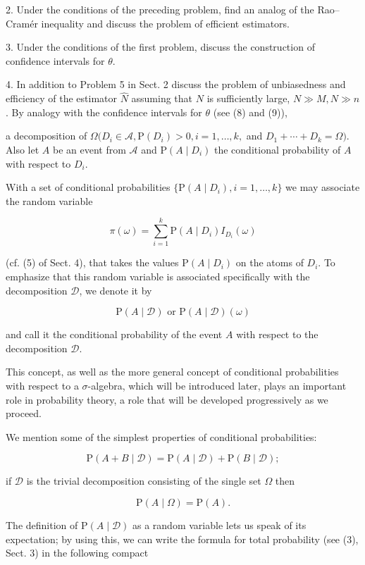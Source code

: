 2. Under the conditions of the preceding problem, find an analog of the Rao–Cramér inequality and discuss the problem of efficient estimators.

3. Under the conditions of the first problem, discuss the construction of confidence intervals for $\theta$.

4. In addition to Problem 5 in Sect. 2 discuss the problem of unbiasedness and efficiency of the estimator $\hat{N}$ assuming that $N$ is sufficiently large, $N \gg M, N \gg n$. By analogy with the confidence intervals for $\theta$ (see (8) and (9)),

a decomposition of $\Omega (D_i \in \mathcal{A}, \text{P}(D_i) > 0, i = 1, \ldots, k,$ and $D_1 + \cdots + D_k = \Omega)$. Also let $A$ be an event from $\mathcal{A}$ and $\text{P}(A \mid D_i)$ the conditional probability of $A$ with respect to $D_i$.

With a set of conditional probabilities $\{\text{P}(A \mid D_i), i = 1, \ldots, k\}$ we may associate the random variable

$$\pi(\omega) = \sum_{i=1}^{k} \text{P}(A \mid D_i) I_{D_i}(\omega)$$

(cf. (5) of Sect. 4), that takes the values $\text{P}(A \mid D_i)$ on the atoms of $D_i$. To emphasize that this random variable is associated specifically with the decomposition $\mathcal{D}$, we denote it by

$$\text{P}(A \mid \mathcal{D}) \text{ or } \text{P}(A \mid \mathcal{D})(\omega)$$

and call it the conditional probability of the event $A$ with respect to the decomposition $\mathcal{D}$.

This concept, as well as the more general concept of conditional probabilities with respect to a $\sigma$-algebra, which will be introduced later, plays an important role in probability theory, a role that will be developed progressively as we proceed.

We mention some of the simplest properties of conditional probabilities:

$$\text{P}(A + B \mid \mathcal{D}) = \text{P}(A \mid \mathcal{D}) + \text{P}(B \mid \mathcal{D});$$

if $\mathcal{D}$ is the trivial decomposition consisting of the single set $\Omega$ then

$$\text{P}(A \mid \Omega) = \text{P}(A).$$

The definition of $\text{P}(A \mid \mathcal{D})$ as a random variable lets us speak of its expectation; by using this, we can write the formula for total probability (see (3), Sect. 3) in the following compact

